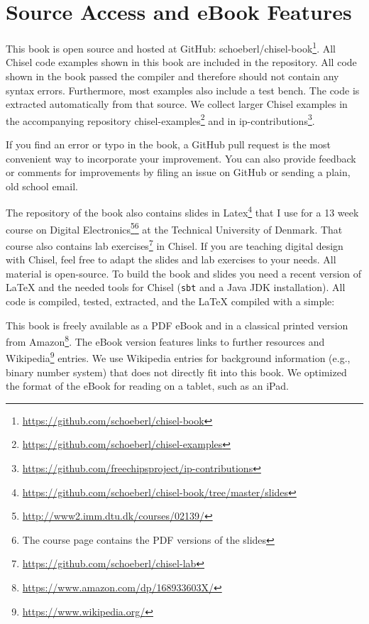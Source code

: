 \documentclass[%
    10pt,
    headinclude, footexclude,
    openright, %
    notitlepage,
    cleardoubleempty,
    headsepline,
    pointlessnumbers,
    bibtotoc, idxtotoc,
    ]{scrbook}
\newcommand{\code}[1]{{\lstinline[basicstyle=\small\ttfamily]{#1}}}
\newcommand{\myref}[2]{\href{#1}{#2}}
\renewcommand{\myref}[2]{{#2}{\footnote{\url{#1}}}}
\begin{document}
\section{Source Access and eBook Features}

This book is open source and hosted at GitHub: \myref{https://github.com/schoeberl/chisel-book}{schoeberl/chisel-book}.
All Chisel code examples shown in this book are included in the repository.
All code shown in the book passed the compiler and therefore should not contain any syntax errors.
Furthermore, most examples also include a test bench.
The code is extracted automatically from that source.
We collect larger Chisel examples in the accompanying repository
\myref{https://github.com/schoeberl/chisel-examples}{chisel-examples}
and in \myref{https://github.com/freechipsproject/ip-contributions}{ip-contributions}.

If you find an error or typo in the book, a GitHub pull request is the most convenient way to incorporate your improvement.
You can also provide feedback or comments for improvements by filing an issue on GitHub
or sending a plain, old school email.

The repository of the book also contains
\myref{https://github.com/schoeberl/chisel-book/tree/master/slides}{slides in Latex}
that I use for a 13 week course on
\myref{http://www2.imm.dtu.dk/courses/02139/}{Digital Electronics}\footnote{The course page
contains the PDF versions of the slides} at the Technical University of Denmark.
That course also contains \myref{https://github.com/schoeberl/chisel-lab}{lab exercises}
in Chisel.
If you are teaching digital design with Chisel, feel free to adapt the slides and lab
exercises to your needs. All material is open-source. To build the book and slides
you need a recent version of LaTeX and the needed tools for Chisel (\code{sbt} and
a Java JDK installation). All code is compiled, tested, extracted, and the LaTeX compiled with
a simple:


This book is freely available as a PDF eBook and in a classical printed version from
\myref{https://www.amazon.com/dp/168933603X/}{Amazon}.
The eBook version features links to further resources
and \myref{https://www.wikipedia.org/}{Wikipedia} entries.
We use Wikipedia entries for background information (e.g., binary number system)
that does not directly fit into this book.
We optimized the format of the eBook for reading on a tablet, such as an iPad.
\end{document}
